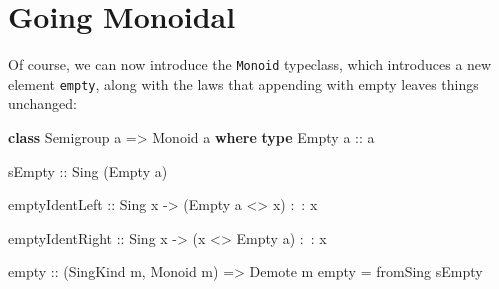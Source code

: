 \documentclass[]{article}
\newenvironment{Shaded}{}{}
\newcommand{\DataTypeTok}[1]{\textcolor[rgb]{0.56,0.13,0.00}{#1}}
\newcommand{\FunctionTok}[1]{\textcolor[rgb]{0.02,0.16,0.49}{#1}}
\newcommand{\KeywordTok}[1]{\textcolor[rgb]{0.00,0.44,0.13}{\textbf{#1}}}
\newcommand{\NormalTok}[1]{#1}
\newcommand{\OtherTok}[1]{\textcolor[rgb]{0.00,0.44,0.13}{#1}}
\begin{document}
\begin{Shaded}
\end{Shaded}

\hypertarget{going-monoidal}{%
\section{Going Monoidal}\label{going-monoidal}}

Of course, we can now introduce the \texttt{Monoid} typeclass, which introduces
a new element \texttt{empty}, along with the laws that appending with empty
leaves things unchanged:

\begin{Shaded}
\begin{Highlighting}[]
\KeywordTok{class} \DataTypeTok{Semigroup}\NormalTok{ a }\OtherTok{=>} \DataTypeTok{Monoid}\NormalTok{ a }\KeywordTok{where}
    \KeywordTok{type} \DataTypeTok{Empty}\OtherTok{ a ::}\NormalTok{ a}

\OtherTok{    sEmpty ::} \DataTypeTok{Sing}\NormalTok{ (}\DataTypeTok{Empty}\NormalTok{ a)}

\NormalTok{    emptyIdentLeft}
\OtherTok{        ::} \DataTypeTok{Sing}\NormalTok{ x}
        \OtherTok{->}\NormalTok{ (}\DataTypeTok{Empty}\NormalTok{ a }\FunctionTok{<>}\NormalTok{ x) }\FunctionTok{:~:}\NormalTok{ x}

\NormalTok{    emptyIdentRight}
\OtherTok{        ::} \DataTypeTok{Sing}\NormalTok{ x}
        \OtherTok{->}\NormalTok{ (x }\FunctionTok{<>} \DataTypeTok{Empty}\NormalTok{ a) }\FunctionTok{:~:}\NormalTok{ x}

\NormalTok{empty}
\OtherTok{    ::}\NormalTok{ (}\DataTypeTok{SingKind}\NormalTok{ m, }\DataTypeTok{Monoid}\NormalTok{ m)}
    \OtherTok{=>} \DataTypeTok{Demote}\NormalTok{ m}
\NormalTok{empty }\FunctionTok{=}\NormalTok{ fromSing sEmpty}
\end{Highlighting}
\end{Shaded}
\end{document}
